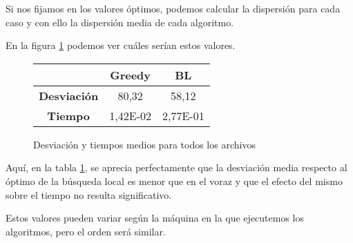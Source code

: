 Si nos fijamos en los valores óptimos, podemos calcular la dispersión para cada caso y con ello la dispersión media de cada algoritmo.

En la figura \ref{fig:dispYTmedios} podemos ver cuáles serían estos valores.

\begin{figure}[H]
    \centering
	\begin{tabular}{|c|c|c|}
	    \hline
	    & \textbf{Greedy} & \textbf{BL}\\
	    \hline
	    \textbf{Desviación} & 80,32 & 58,12\\
	    \hline
	    \textbf{Tiempo} & 1,42E-02 & 2,77E-01\\
	    \hline
	\end{tabular}
	\caption{Desviación y tiempos medios para todos los archivos}
	\label{fig:dispYTmedios}
\end{figure}

Aquí, en la tabla \ref{fig:dispYTmedios}, se aprecia perfectamente que la desviación media respecto al óptimo de la búsqueda local es menor que en el voraz y que el efecto del mismo sobre el tiempo no resulta significativo.

Estos valores pueden variar según la máquina en la que ejecutemos los algoritmos, pero el orden será similar.

\newpage

